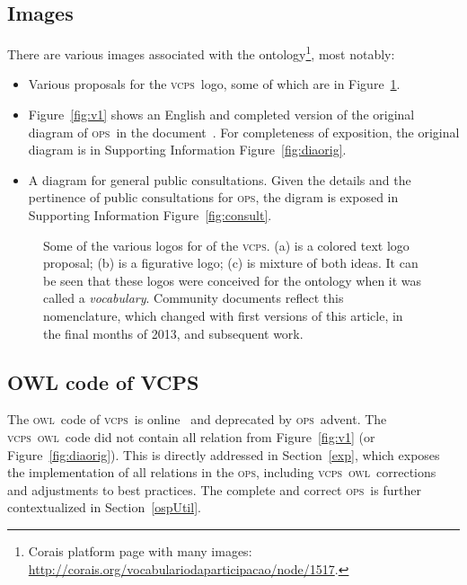 \documentclass[10pt,letterpaper]{article}
\newcommand{\ops}{\textsc{ops}}
\newcommand{\vcps}{\textsc{vcps}}
\newcommand{\owl}{\textsc{owl}}
\begin{document}
\subsection{Images}\label{sec:im}
There are various images associated with the ontology\footnote{Corais platform page with many images: \url{http://corais.org/vocabulariodaparticipacao/node/1517}.}, most notably:

\begin{itemize}
    \item Various proposals for the \vcps\ logo, some of which are in Figure~\ref{logo}.
    \item Figure~\ref{fig:v1} shows an English and completed version of the original diagram of \ops\ in the document~\cite{conceptualMod}. For completeness of exposition, the original diagram is in Supporting Information Figure~\ref{fig:diaorig}.
    \item A diagram for general public consultations. Given the details and the pertinence of public consultations for \ops, the digram is exposed in Supporting Information Figure~\ref{fig:consult}.
\end{itemize}

\begin{figure}[!h]
    \centering
    \caption{Some of the various logos for of the \vcps. (a) is a colored text logo proposal; (b) is a figurative logo; (c) is mixture of both ideas. It can be seen that these logos were conceived for the ontology when it was called a \emph{vocabulary}. Community documents reflect this nomenclature, which changed with first versions of this article, in the final months of 2013, and subsequent work.}
    \label{logo}
\end{figure}

\subsection{OWL code of VCPS}\label{owl}

The \owl\ code of \vcps\ is online~\cite{owlVcps} and deprecated by \ops\ advent. 
The \vcps\ \owl\ code did not contain all relation from Figure~\ref{fig:v1} (or Figure~\ref{fig:diaorig}). This is directly addressed in Section~\ref{exp}, which exposes the implementation of all relations in the \ops, including \vcps\ \owl\ corrections and adjustments to best practices. The complete and correct \ops\ is further contextualized in Section~\ref{ospUtil}.
\end{document}
